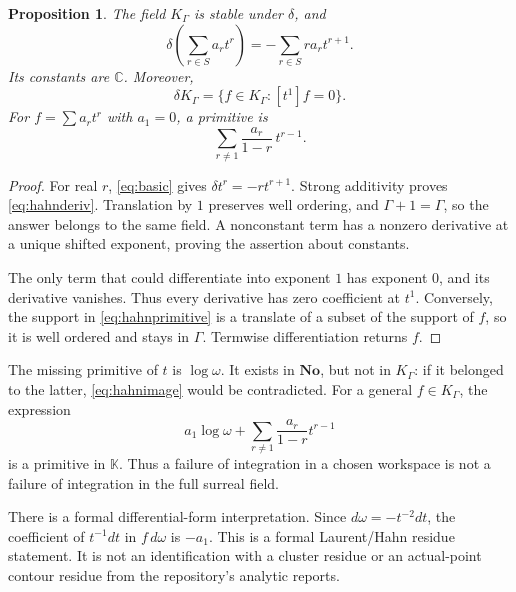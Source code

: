 \documentclass[11pt,letterpaper]{article}
\numberwithin{equation}{section}
\newtheorem{proposition}[theorem]{Proposition}
\theoremstyle{definition}
\theoremstyle{remark}
\newcommand{\No}{\mathbf{No}}
\newcommand{\K}{\mathbb K}
\newcommand{\C}{\mathbb C}
\begin{document}
\begin{proposition}\label{prop:hahnderiv}
The field $K_\Gamma$ is stable under $\delta$, and
\begin{equation}\label{eq:hahnderiv}
 \delta\left(\sum_{r\in S}a_rt^r\right)
 =-\sum_{r\in S}r a_rt^{r+1}.
\end{equation}
Its constants are $\C$. Moreover,
\begin{equation}\label{eq:hahnimage}
 \delta K_\Gamma=\{f\in K_\Gamma:[t^1]f=0\}.
\end{equation}
For $f=\sum a_rt^r$ with $a_1=0$, a primitive is
\begin{equation}\label{eq:hahnprimitive}
 \sum_{r\ne1}\frac{a_r}{1-r}\,t^{r-1}.
\end{equation}
\end{proposition}
\begin{proof}
For real $r$, \eqref{eq:basic} gives $\delta t^r=-rt^{r+1}$. Strong additivity proves \eqref{eq:hahnderiv}. Translation by $1$ preserves well ordering, and $\Gamma+1=\Gamma$, so the answer belongs to the same field. A nonconstant term has a nonzero derivative at a unique shifted exponent, proving the assertion about constants.

The only term that could differentiate into exponent $1$ has exponent $0$, and its derivative vanishes. Thus every derivative has zero coefficient at $t^1$. Conversely, the support in \eqref{eq:hahnprimitive} is a translate of a subset of the support of $f$, so it is well ordered and stays in $\Gamma$. Termwise differentiation returns $f$.
\end{proof}

The missing primitive of $t$ is $\log\omega$. It exists in $\No$, but not in $K_\Gamma$: if it belonged to the latter, \eqref{eq:hahnimage} would be contradicted. For a general $f\in K_\Gamma$, the expression
\begin{equation}\label{eq:logprimitive}
 a_1\log\omega+
 \sum_{r\ne1}\frac{a_r}{1-r}t^{r-1}
\end{equation}
is a primitive in $\K$. Thus a failure of integration in a chosen workspace is not a failure of integration in the full surreal field.

There is a formal differential-form interpretation. Since $d\omega=-t^{-2}dt$, the coefficient of $t^{-1}dt$ in $f\,d\omega$ is $-a_1$. This is a formal Laurent/Hahn residue statement. It is not an identification with a cluster residue or an actual-point contour residue from the repository's analytic reports.
\end{document}
